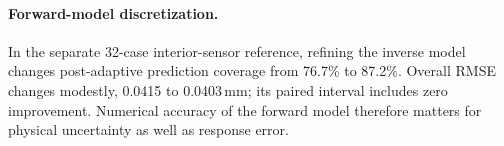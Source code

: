 \paragraph{Forward-model discretization.}
In the separate 32-case interior-sensor reference, refining the inverse model changes post-adaptive prediction coverage from 76.7\% to 87.2\%. Overall RMSE changes modestly, 0.0415 to 0.0403\,mm; its paired interval includes zero improvement. Numerical accuracy of the forward model therefore matters for physical uncertainty as well as response error.
